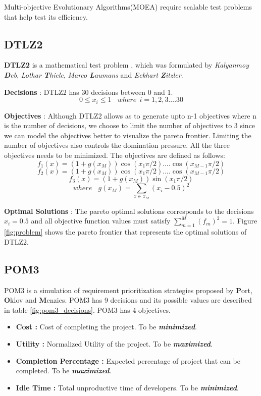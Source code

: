 \documentclass[conference]{IEEEtran}
\begin{document}
	Multi-objective Evolutionary Algorithms(MOEA) require scalable test problems that help test its efficiency. 
	
	\subsection{DTLZ2}
	\label{dtlz2}
	\textbf{DTLZ2} is a mathematical test problem \cite{debMOEA02}, which was formulated by \textit{Kalyanmoy \textbf{D}eb}, \textit{Lothar \textbf{T}hiele}, \textit{Marco \textbf{L}aumans} and \textit{Eckhart \textbf{Z}itzler}. 
	
	\textbf{Decisions} : DTLZ2 has 30 decisions between 0 and 1.
	\[0 \leq {x}_{i} \leq 1 \ \ \ \ where \ \  i = 1,2 ,3 .... 30\]
	
	\textbf{Objectives} : Although DTLZ2 allows as to generate upto n-1 objectives where n is the number of decisions, we choose to limit the number of objectives to 3 since we can model the objectives better to visualize the pareto frontier. Limiting the number of objectives also controls the domination pressure. All the three objectives needs to be minimized. The objectives are defined as follows:
	\[{f}_{1}(x) = (1+g({x}_{M}))\cos({x}_{1} \pi/2)....\cos({x}_{M-1} \pi/2)\]
	\[{f}_{2}(x) = (1+g({x}_{M}))\cos({x}_{1} \pi/2)....\cos({x}_{M-1} \pi/2)\]
	\[{f}_{3}(x) = (1+g({x}_{M}))\sin({x}_{1} \pi/2)\]
	\[where \ \ \ \ g({x}_{M}) = \sum_{x \in {x}_{M}} (x_i - 0.5)^2 \]
	
	\textbf{Optimal Solutions} : The pareto optimal solutions corresponds to the decisions \(x_i = 0.5\) and all objective function values must satisfy \(\sum_{m=1}^M (f_m)^2 = 1\). Figure \ref{fig:problem} shows the pareto frontier that represents the optimal solutions of DTLZ2.
	
	\subsection{POM3}
	\label{pom3}
	POM3 is a simulation of requirement prioritization strategies proposed by \textbf{P}ort, \textbf{O}klov and \textbf{M}enzies\cite{boehm03POM}. POM3 has 9 decisions and its possible values are described in table \ref{fig:pom3_decisions}. POM3 has 4 objectives.
	
	\begin{itemize}
	\item \textbf{Cost :} Cost of completing the project. To be \textbf{\textit{minimized}}.
	\item \textbf{Utility :} Normalized Utility of the project. To be \textbf{\textit{maximized}}.
	\item \textbf{Completion Percentage :} Expected percentage of project that can be completed. To be \textbf{\textit{maximized}}.
	\item \textbf{Idle Time :} Total unproductive time of developers. To be \textbf{\textit{minimized}}. 
	\end{itemize}
	
\end{document}
